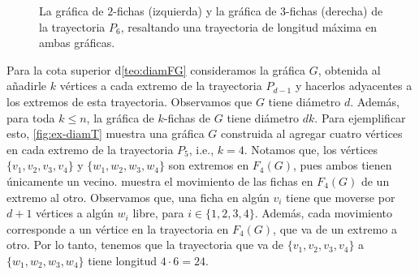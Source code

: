 \begin{figure}[ht!]

\caption{La gr\'afica de $2$-fichas (izquierda) y la gr\'afica de $3$-fichas
(derecha) de la trayectoria $P_6$, resaltando una trayectoria de longitud
m\'axima en ambas gr\'aficas.}
\label{fig:ex-diamP}       
\end{figure}

Para la cota superior d\cref{teo:diamFG} consideramos la gr\'afica $G$, obtenida
al a\~{n}adirle $k$ v\'ertices a cada extremo de la trayectoria $P_{d -1}$ y
hacerlos adyacentes a los extremos de esta trayectoria. Observamos que $G$ tiene
di\'ametro $d$. Adem\'as, para toda $k \leq n$, la gr\'afica de $k$-fichas de
$G$ tiene di\'ametro $dk$. Para ejemplificar esto, \cref{fig:ex-diamT} muestra
una gr\'afica $G$ construida al agregar cuatro v\'ertices en cada extremo de la
trayectoria $P_5$, i.e., $k=4$. Notamos que, los v\'ertices
$\{v_1,v_2,v_3,v_4\}$ y $\{w_1,w_2,w_3,w_4\}$ son extremos en $F_4(G)$, pues
ambos tienen \'unicamente un vecino.  muestra el movimiento
de las fichas en $F_4(G)$ de un extremo al otro. Observamos que, una ficha en
alg\'un $v_i$ tiene que moverse por $d +1$ v\'ertices a alg\'un $w_i$ libre,
para $i \in \{1,2,3,4\}$. Adem\'as, cada movimiento corresponde a un v\'ertice
en la trayectoria en $F_4(G)$, que va de un extremo a otro. Por lo tanto,
tenemos que la trayectoria que va de $\{v_1,v_2,v_3,v_4\}$ a
$\{w_1,w_2,w_3,w_4\}$ tiene longitud $4 \cdot 6 = 24$.

\newpage

